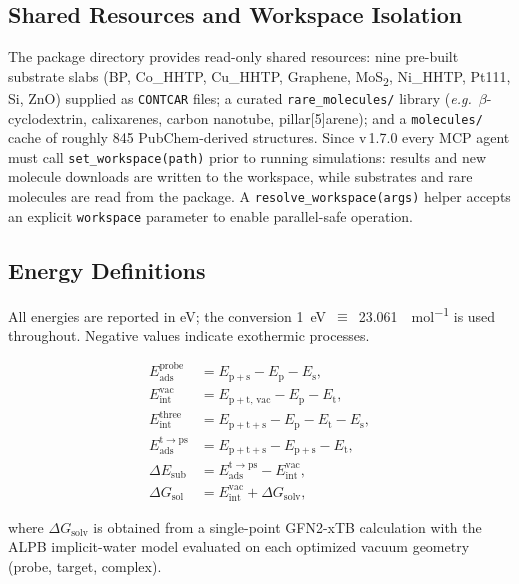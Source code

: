 \subsection{Shared Resources and Workspace Isolation}

The package directory provides read-only shared resources: nine
pre-built substrate slabs ({BP}, {Co\_HHTP}, {Cu\_HHTP}, {Graphene},
{MoS\textsubscript{2}}, {Ni\_HHTP}, {Pt111}, {Si}, {ZnO}) supplied as
\texttt{CONTCAR} files; a curated \texttt{rare\_molecules/} library
(\textit{e.g.}\ $\beta$-cyclodextrin, calixarenes, carbon nanotube,
pillar[5]arene); and a \texttt{molecules/} cache of roughly 845
PubChem-derived structures. Since v\,1.7.0 every MCP agent must call
\texttt{set\_workspace(path)} prior to running simulations: results and
new molecule downloads are written to the workspace, while substrates
and rare molecules are read from the package. A
\texttt{resolve\_workspace(args)} helper accepts an explicit
\texttt{workspace} parameter to enable parallel-safe operation.

\subsection{Energy Definitions}
\label{sec:energy-defs}

All energies are reported in \si{\eV}; the conversion
\SI{1}{\eV}~$\equiv$~\SI{23.061}{\kcal\per\mol} is used throughout.
Negative values indicate exothermic processes.

\begin{align}
E_{\mathrm{ads}}^{\mathrm{probe}} &= E_{\mathrm{p+s}} - E_{\mathrm{p}} - E_{\mathrm{s}}, \\
E_{\mathrm{int}}^{\mathrm{vac}} &= E_{\mathrm{p+t,\,vac}} - E_{\mathrm{p}} - E_{\mathrm{t}}, \\
E_{\mathrm{int}}^{\mathrm{three}} &= E_{\mathrm{p+t+s}} - E_{\mathrm{p}} - E_{\mathrm{t}} - E_{\mathrm{s}}, \\
E_{\mathrm{ads}}^{\mathrm{t\to ps}} &= E_{\mathrm{p+t+s}} - E_{\mathrm{p+s}} - E_{\mathrm{t}}, \\
\Delta E_{\mathrm{sub}} &= E_{\mathrm{ads}}^{\mathrm{t\to ps}} - E_{\mathrm{int}}^{\mathrm{vac}}, \\
\Delta G_{\mathrm{sol}} &= E_{\mathrm{int}}^{\mathrm{vac}} + \Delta G_{\mathrm{solv}},
\end{align}

where $\Delta G_{\mathrm{solv}}$ is obtained from a single-point GFN2-xTB
calculation with the ALPB implicit-water model evaluated on each
optimized vacuum geometry (probe, target, complex).

